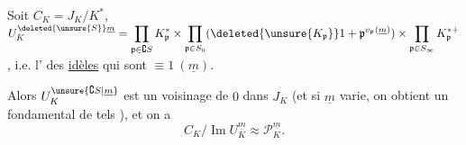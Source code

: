 Soit $C_K=J_K/K^*$, $U_K^{\deleted{\unsure{S}}\underline m}=\displaystyle\prod_{\mathfrak p\in\complement S}K_{\mathfrak p}^*\times\prod_{\mathfrak p\in S_0}(\deleted{\unsure{K_{\mathfrak p}}}1+\mathfrak p^{v_{\mathfrak p}(\underline m)})\times\prod_{\mathfrak p\in S_\infty}K_{\mathfrak p}^{*+}$, i.e.  l' des \uline{idèles} qui sont $\equiv1\ (\underline m)$.

Alors $U_K^{\unsure{\complement S|\underline m}}$ est un voisinage  de $0$ dans $J_K$ (et si $\underline m$ varie, on obtient un  fondamental de tels ), et  on a
\[
C_K/\operatorname{Im}U_K^{\underline m}\approx\mathscr{P}_K^{\underline m}.
\]
